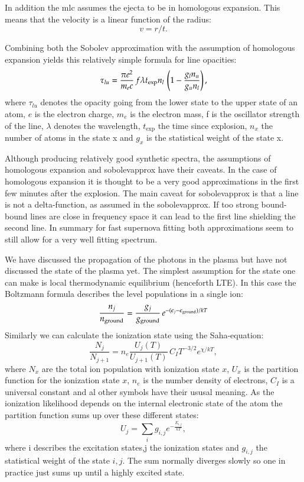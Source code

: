 In addition the \gls{mlc} assumes the ejecta to be in homologous expansion. This means that the velocity is a linear function of the radius:
\[
	v=  r / t.
\]

Combining both the Sobolev approximation with the assumption of homologous expansion yields this relatively simple formula for line opacities:
\[
\tau_{lu} = \frac{\pi e^2}{m_e c}\, f \lambda t_{\rm exp} n_l\, \left(1 - \frac{g_l n_u}{g_u n_l}\right), 
\]
where $\tau_{lu}$ denotes the opacity going from the lower state to the upper state of an atom, $e$ is the electron charge, $m_e$ is the electron mass, f is the oscillator strength of the line, $\lambda$ denotes the wavelength, $t_\textrm{exp}$ the time since explosion, $n_x$ the number of atoms in the state x and $g_x$ is the statistical weight of the state x.

Although producing relatively good synthetic spectra, the assumptions of homologous expansion and \gls{sobolevapprox} have their caveats. In the case of homologous expansion it is thought to be a very good approximations in the first few minutes after the explosion. The main caveat for \gls{sobolevapprox} is that a line is not a delta-function, as assumed in the \gls{sobolevapprox}. If too strong bound-bound lines are close in frequency space it can lead to the first line shielding the second line. In summary for fast supernova fitting both approximations seem to still allow for a very well fitting spectrum.

We have discussed the propagation of the photons in the plasma but have not discussed the state of the plasma yet. The simplest assumption for the state one can make is local thermodynamic equilibrium (henceforth LTE). In this case the Boltzmann formula describes the level populations in a single ion:
\[
\frac{n_j}{n_{\rm ground}} = \frac{g_j}{g_{\rm ground}}\,e^{-(\epsilon_j - \epsilon_{\rm ground})/kT}
\]
Similarly we can calculate the ionization state using the Saha-equation:
\[
	\frac{N_j}{N_{j+1}} = n_e \frac{U_j(T)}{U_{j+1}(T)}\,C_I T^{-3/2} e^{\chi/kT},
\]
where $N_x$ are the total ion population with ionization state $x$, $U_x$ is the partition function for the ionization state $x$, $n_e$ is the number density of electrons, $C_I$ is a universal constant and al other symbols have their ususal meaning. As the ionization likelihood depends on the internal electronic state of the atom the partition function sums up over these different states:
\[
U_j = \sum_i g_{i,j} e^{-\frac{E_{i,j}}{kT}},
\]
where i describes the excitation states,j the ionization states and $g_{i,j}$ the statistical weight of the state $i,j$. 
The sum normally diverges slowly so one in practice just sums up until a highly excited state.

